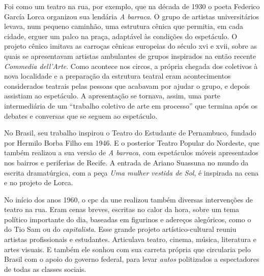Foi como um teatro na rua, por exemplo, que na década de 1930 o
poeta Federico García Lorca organizou sua lendária {\it A barraca}. O grupo de
artistas universitários levava, num pequeno caminhão, uma estrutura
cênica que permitia, em cada cidade, erguer um palco na praça, adaptável
às condições do espetáculo. O projeto cênico imitava as carroças cênicas
europeias do século {\sc xvi} e {\sc xvii}, sobre as quais se apresentavam artistas
ambulantes de grupos inspirados na então recente {\it Commedia
dell'Arte}. Como acontece nos circos, a própria chegada dos coletivos
à nova localidade e a preparação da estrutura teatral eram
acontecimentos considerados teatrais pelas pessoas que acabavam por
ajudar o grupo, e depois assistiam ao espetáculo. A apresentação se
tornava, assim, uma parte intermediária de um “trabalho coletivo de arte
em processo” que termina após os debates e conversas que se seguem ao
espetáculo.


No Brasil, seu trabalho inspirou o Teatro do Estudante de Pernambuco,
fundado por Hermilo Borba Filho em 1946. E o posterior Teatro Popular do
Nordeste, que também realizou a sua versão de {\it A barraca}, com
espetáculos móveis apresentados nos bairros e periferias de Recife. A
entrada de Ariano Suassuna no mundo da escrita dramatúrgica, com a peça
{\it Uma mulher vestida de Sol}, é inspirada na cena e no projeto de
Lorca.


No início dos anos 1960, o {\sc cpc} da {\sc une} realizou também diversas
intervenções de teatro na rua. Eram cenas breves, escritas no
calor da hora, sobre um tema político importante do dia, baseadas em
figurinos e adereços alegóricos, como o do Tio Sam ou do
{\it capitalista}. Esse grande projeto artístico-cultural reuniu
artistas profissionais e estudantes. Articulava teatro, cinema, música,
literatura e artes visuais. E também ele sonhou com sua carreta própria
que circularia pelo Brasil com o apoio do governo federal, para levar
{\it autos} politizados a espectadores de todas as classes sociais.

